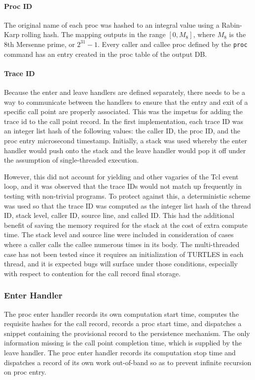 \documentclass{article}[letter,10pt]
\begin{document}
{{{      \paragraph{Proc ID}{
        The original name of each proc was hashed to an integral value using a Rabin-Karp rolling hash\autocite{univhash}.
        The mapping outputs in the range $[0, M_8]$, where $M_8$ is the 8th Mersenne prime, or $2^{31}-1$.
        Every caller and callee proc defined by the \texttt{proc} command has an entry created in the proc
        table of the output DB.
      }
      \paragraph{Trace ID}{
        Because the enter and leave handlers are defined separately, there needs to be a way to communicate
        between the handlers to ensure that the entry and exit of a specific call point are properly associated.
        This was the impetus for adding the trace id to the call point record. In the first implementation,
        each trace ID was an integer list hash of the following values: the caller ID, the proc ID, and the
        proc entry microsecond timestamp. Initially, a stack was used whereby the enter handler would push
        onto the stack and the leave handler would pop it off under the assumption of single-threaded execution.

        However, this did not account for yielding and other vagaries of the Tcl event loop, and it was
        observed that the trace IDs would not match up frequently in testing with non-trivial programs.
        To protect against this, a deterministic scheme was used so that the trace ID was computed
        as the integer list hash of the thread ID, stack level, caller ID, source line, and called ID.
        This had the additional benefit of saving the memory required for the stack at the cost of extra compute time.
        The stack level and source line were included in consideration of cases where a caller calls the callee
        numerous times in its body. The multi-threaded case has not been tested since it requires an
        initialization of TURTLES in each thread, and it is expected bugs will surface under those conditions,
        especially with respect to contention for the call record final storage.
      }
    }

    \subsubsection{Enter Handler}{
      The proc enter handler records its own computation start time, computes the requisite hashes for the call record,
      records a proc start time, and dispatches a snippet containing the provisional record to the persistence mechanism.
      The only information missing is the call point completion time, which is supplied by the leave handler.
      The proc enter handler records its computation stop time and dispatches a record of its own work out-of-band
      so as to prevent infinite recursion on proc entry.
    }

}}
\end{document}
